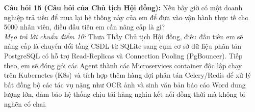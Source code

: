 \begin{checkpointbox}
\textbf{Câu hỏi 15 (Câu hỏi của Chủ tịch Hội đồng):} Nếu bây giờ có một doanh nghiệp trả tiền để mua lại hệ thống này của em để đưa vào vận hành thực tế cho 5000 nhân viên, điều đầu tiên em cần nâng cấp là gì?\\
\textit{Mẹo trả lời chuẩn điểm 10:} Thưa Thầy Chủ tịch Hội đồng, điều đầu tiên em sẽ nâng cấp là chuyển đổi tầng CSDL từ SQLite sang cụm cơ sở dữ liệu phân tán PostgreSQL có hỗ trợ Read-Replicas và Connection Pooling (PgBouncer). Tiếp theo, em sẽ đóng gói các Agent thành các Microservices container độc lập chạy trên Kubernetes (K8s) và tích hợp thêm hàng đợi phân tán Celery/Redis để xử lý bất đồng bộ các tác vụ nặng như OCR ảnh và sinh văn bản báo cáo Word dung lượng lớn, đảm bảo hệ thống chịu tải hàng nghìn kết nối đồng thời mà không bị nghẽn cổ chai.
\end{checkpointbox}

